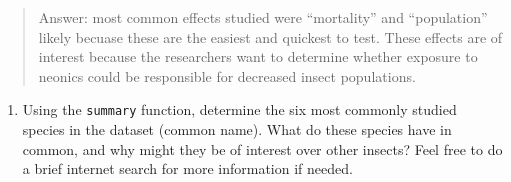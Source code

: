 \documentclass[
]{article}
\newenvironment{Shaded}{\begin{snugshade}}{\end{snugshade}}
\newcommand{\KeywordTok}[1]{\textcolor[rgb]{0.13,0.29,0.53}{\textbf{#1}}}
\newcommand{\NormalTok}[1]{#1}
\newcommand{\OperatorTok}[1]{\textcolor[rgb]{0.81,0.36,0.00}{\textbf{#1}}}
\providecommand{\tightlist}{%
  \setlength{\itemsep}{0pt}\setlength{\parskip}{0pt}}
\begin{document}
\begin{quote}
Answer: most common effects studied were ``mortality'' and
``population'' likely becuase these are the easiest and quickest to
test. These effects are of interest because the researchers want to
determine whether exposure to neonics could be responsible for decreased
insect populations.
\end{quote}

\begin{enumerate}
\def\labelenumi{\arabic{enumi}.}
\setcounter{enumi}{6}
\tightlist
\item
  Using the \texttt{summary} function, determine the six most commonly
  studied species in the dataset (common name). What do these species
  have in common, and why might they be of interest over other insects?
  Feel free to do a brief internet search for more information if
  needed.
\end{enumerate}

\begin{Shaded}
\end{Shaded}
\end{document}
